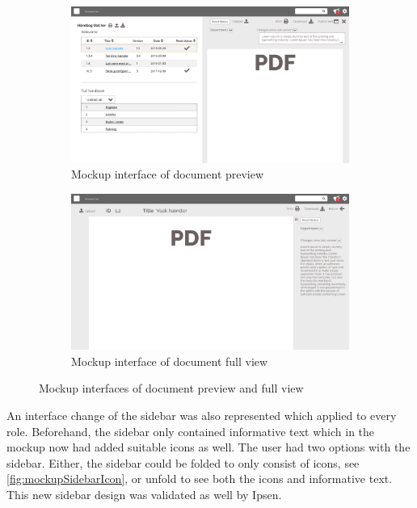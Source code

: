 \documentclass[../../master.tex]{subfiles}
\begin{document}
\begin{figure}[H]
	\centering
	\begin{subfigure}[b]{0.48\textwidth}
		\includegraphics[width=\textwidth]{billeder/PreviewVersion.jpg}
		\caption{Mockup interface of document preview}
	\end{subfigure}
	\quad
	\begin{subfigure}[b]{0.48\textwidth}
		\includegraphics[width=\textwidth]{billeder/FullView.jpg}
		\caption{Mockup interface of document full view}
	\end{subfigure}
	\caption{Mockup interfaces of document preview and full view}\label{fig:mockupPreview}
\end{figure}

An interface change of the sidebar was also represented which applied to every role.
Beforehand, the sidebar only contained informative text which in the mockup now had added suitable icons as well.
The user had two options with the sidebar.
Either, the sidebar could be folded to only consist of icons, see \cref{fig:mockupSidebarIcon}, or unfold to see both the icons and informative text.
This new sidebar design was validated as well by Ipsen.
\end{document}
